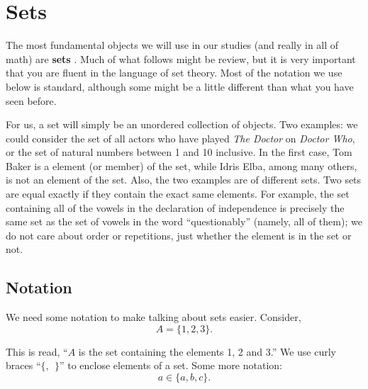 \documentclass[10pt,]{book}
\newcommand{\terminology}[1]{\textbf{#1}}
\theoremstyle{plain}
\theoremstyle{definition}
\theoremstyle{definition}
\theoremstyle{definition}
\begin{document}
\section[Sets]{Sets}\label{sec_intro-sets}
\typeout{************************************************}
\typeout{************************************************}

      The most fundamental objects we will use in our studies (and really in all of math) are
      \terminology{sets}
      . Much of what follows might be review, but it is very important that you are fluent in the language of set theory. Most of the notation we use below is standard, although some might be a little different than what you have seen before.
\par

      For us, a set will simply be an unordered collection of objects. Two examples: we could consider the set of all actors who have played \emph{The Doctor} on \emph{Doctor Who}, or the set of natural numbers between 1 and 10 inclusive. In the first case, Tom Baker is a element (or member) of the set, while Idris Elba, among many others, is not an element of the set. Also, the two examples are of different sets. Two sets are equal exactly if they contain the exact same elements. For example, the set containing all of the vowels in the declaration of independence is precisely the same set as the set of vowels in the word ``questionably'' (namely, all of them); we do not care about order or repetitions, just whether the element is in the set or not.
\typeout{************************************************}
\typeout{************************************************}
\subsection[Notation]{Notation}\label{subsec_notation}

      We need some notation to make talking about sets easier. Consider,
      \begin{equation*}
        A = \{1, 2, 3\}.
      \end{equation*}
\par

      This is read, ``\(A\) is the set containing the elements 1, 2 and 3.'' We use curly braces ``\(\{,~~ \}\)'' to enclose elements of a set. Some more notation:
      \begin{equation*}
        a \in \{a, b, c\}.
      \end{equation*}
\par
\end{document}
